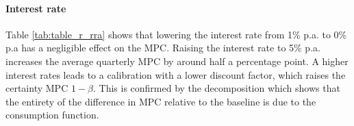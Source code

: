 
\paragraph{Interest rate}



Table \ref{tab:table_r_rra} shows that lowering the interest rate from 1\% p.a. to 0\% p.a has a negligible effect on the MPC. Raising the interest rate to 5\% p.a. increases the average quarterly MPC by around half a percentage point. A higher interest rates leads to a calibration with a lower discount factor, which raises the certainty MPC $1-\beta$. This is confirmed by the decomposition which shows that the entirety of the difference in MPC relative to the baseline is due to the consumption function. 


